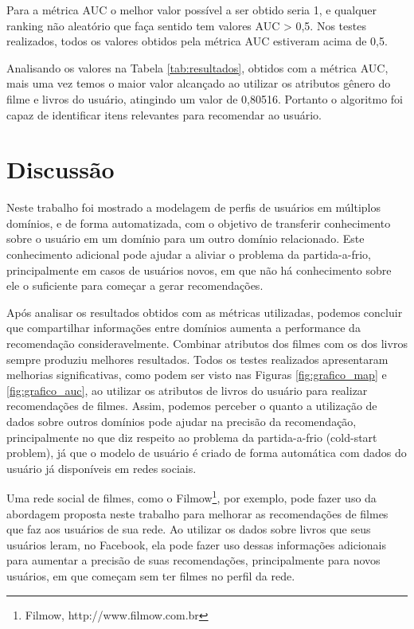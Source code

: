 Para a métrica \ac{AUC} o melhor valor possível a ser obtido seria 1, e qualquer ranking não aleatório que faça sentido tem valores AUC > 0,5. Nos testes realizados, todos os valores obtidos pela métrica AUC estiveram acima de 0,5.

Analisando os valores na Tabela \ref{tab:resultados}, obtidos com a métrica \ac{AUC}, mais uma vez temos o maior valor alcançado ao utilizar os atributos gênero do filme e livros do usuário, atingindo um valor de 0,80516. Portanto o algoritmo foi capaz de identificar itens relevantes para recomendar ao usuário.




\section{Discussão}

Neste trabalho foi mostrado a modelagem de perfis de usuários em múltiplos domínios, e de forma automatizada, com o objetivo de transferir conhecimento sobre o usuário em um domínio para um outro domínio relacionado. Este conhecimento adicional pode ajudar a aliviar o problema da partida-a-frio, principalmente em casos de usuários novos, em que não há conhecimento sobre ele o suficiente para começar a gerar recomendações.

Após analisar os resultados obtidos com as métricas utilizadas, podemos concluir que compartilhar informações entre domínios aumenta a performance da recomendação consideravelmente. Combinar atributos dos filmes com os dos livros sempre produziu melhores resultados. Todos os testes realizados apresentaram melhorias significativas, como podem ser visto nas Figuras \ref{fig:grafico_map} e \ref{fig:grafico_auc}, ao utilizar os atributos de livros do usuário para realizar recomendações de filmes. Assim, podemos perceber o quanto a utilização de dados sobre outros domínios pode ajudar na precisão da recomendação, principalmente no que diz respeito ao problema da partida-a-frio (cold-start problem), já que o modelo de usuário é criado de forma automática com dados do usuário já disponíveis em redes sociais.

Uma rede social de filmes, como o Filmow\footnote{Filmow, http://www.filmow.com.br}, por exemplo, pode fazer uso da abordagem proposta neste trabalho para melhorar as recomendações de filmes que faz aos usuários de sua rede. Ao utilizar os dados sobre livros que seus usuários leram, no Facebook, ela pode fazer uso dessas informações adicionais para aumentar a precisão de suas recomendações, principalmente para novos usuários, em que começam sem ter filmes no perfil da rede.








